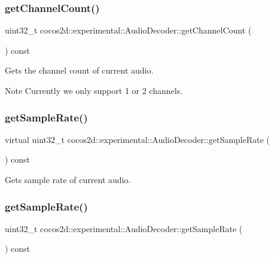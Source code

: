 \subsubsection{\texorpdfstring{get\+Channel\+Count()}{getChannelCount()}\hspace{0.1cm}{\footnotesize\ttfamily [2/2]}}
{\footnotesize\ttfamily uint32\+\_\+t cocos2d\+::experimental\+::\+Audio\+Decoder\+::get\+Channel\+Count (\begin{DoxyParamCaption}{ }\end{DoxyParamCaption}) const}

Gets the channel count of current audio. \begin{DoxyNote}{Note}
Currently we only support 1 or 2 channels. 
\end{DoxyNote}
\mbox{\label{classcocos2d_1_1experimental_1_1AudioDecoder_a368e97749cd9e8521d2f7fdd2a4acd24}} 
\subsubsection{\texorpdfstring{get\+Sample\+Rate()}{getSampleRate()}\hspace{0.1cm}{\footnotesize\ttfamily [1/2]}}
{\footnotesize\ttfamily virtual uint32\+\_\+t cocos2d\+::experimental\+::\+Audio\+Decoder\+::get\+Sample\+Rate (\begin{DoxyParamCaption}{ }\end{DoxyParamCaption}) const\hspace{0.3cm}{\ttfamily [virtual]}}

Gets sample rate of current audio. \mbox{\label{classcocos2d_1_1experimental_1_1AudioDecoder_af721fc8972c793a0b255dbb3e2f7c6a0}} 
\subsubsection{\texorpdfstring{get\+Sample\+Rate()}{getSampleRate()}\hspace{0.1cm}{\footnotesize\ttfamily [2/2]}}
{\footnotesize\ttfamily uint32\+\_\+t cocos2d\+::experimental\+::\+Audio\+Decoder\+::get\+Sample\+Rate (\begin{DoxyParamCaption}{ }\end{DoxyParamCaption}) const}

